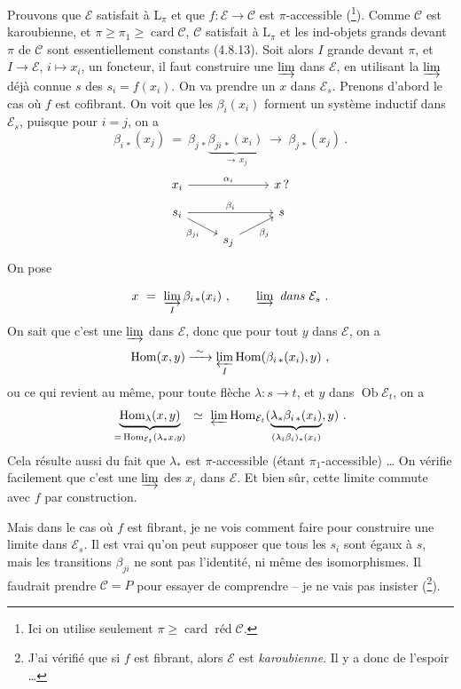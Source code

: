\documentclass[11pt]{article}
\newcommand{\printedpage}[1]{\marginpar{\footnotesize p.~#1}}
\newcommand{\msp}[1]{\marginpar{\footnotesize [#1]}}
\newcommand{\cE}{\mathcal{E}}
\newcommand{\cC}{\mathcal{C}}
\newcommand{\Ob}{\operatorname{Ob}}
\newcommand{\Hom}{\operatorname{Hom}}
\newcommand{\card}{\operatorname{card}}
\newcommand{\red}{\operatorname{\text{réd}}}
\begin{document}
Prouvons que $\cE$ satisfait à $\mathrm{L}_{\pi}$ et que $f : \cE \longrightarrow \cC$ est $\pi$-accessible (\footnote[182]{Ici on utilise seulement $\pi \geqslant \card \red \cC$.}). Comme $\cC$ est karoubienne, et $\pi \geqslant \pi_1 \geqslant \card \cC$, $\cC$ satisfait à $\mathrm{L}_{\pi}$ et les ind-objets grands devant $\pi$ de $\cC$ sont essentiellement constants (4.8.13). Soit alors $I$ grande devant $\pi$, et $I \longrightarrow \cE$, $i \longmapsto x_i$, un foncteur, il faut construire une $\varinjlim$ dans $\cE$, en utilisant la $\varinjlim$ déjà connue $s$ des $s_i = f(x_i)$. On va prendre un $x$ dans $\cE_s$. Prenons d'abord le cas où $f$ est cofibrant. On voit que les $\beta_i(x_i)$ forment un système inductif dans $\cE_s$, puisque pour $i = j$, on a
\[
\beta_{i\,*}(x_j) \ = \ \beta_{j\,*} \underbrace{\beta_{ji\,*}(x_i)}_{\longrightarrow \, x_j} \ \longrightarrow \ \beta_{j\,*}(x_j) \ . %
\]
\[
\begin{tikzcd}[row sep=small]
x_i \arrow[rr, "\alpha_i"] & & x \, ? \\
s_i \arrow[rr, "\beta_i"] \arrow[dr, "\beta_{ji}"'] & & s \\
& s_j \arrow[ur, "\beta_j"'] &
\end{tikzcd}
\]
On pose

\printedpage{168}
\msp{page 438}
\[
x \ = \ \varinjlim_{I} \beta_{i\,*}(x_i) \ , \qquad \varinjlim \ \textit{dans } \cE_s \ .
\]
On sait que c'est une $\varinjlim$ dans $\cE$, donc que pour tout $y$ dans $\cE$, on a
\[
\Hom(x, y) \xrightarrow{\ \sim\ } \varprojlim_{I} \Hom(\beta_{i\,*}(x_i), y) \ ,
\]
ou ce qui revient au même, pour toute flèche $\lambda : s \longrightarrow t$, et $y$ dans $\Ob \cE_t$, on a
\[
\underbrace{\Hom_{\lambda}(x, y)}_{= \, \Hom_{\cE_t}(\lambda_* x, y)} \ \simeq \ \varprojlim \Hom_{\cE_t}(\underbrace{\lambda_* \beta_{i\,*}(x_i)}_{(\lambda_i \beta_i)_*(x_i)}, y) \ .
\]
Cela résulte aussi du fait que $\lambda_*$ est $\pi$-accessible (étant $\pi_1$-accessible) \dots{} On vérifie facilement que c'est une $\varinjlim$ des $x_i$ dans $\cE$. Et bien sûr, cette limite commute avec $f$ par construction.

Mais dans le cas où $f$ est fibrant, je ne vois comment faire pour construire une limite dans $\cE_s$. Il est vrai qu'on peut supposer que tous les $s_i$ sont égaux à $s$, mais les transitions $\beta_{ji}$ ne sont pas l'identité, ni même des isomorphismes. Il faudrait prendre $\cC = P$ pour essayer de comprendre -- je ne vais pas insister (\footnote[183]{J'ai vérifié que si $f$ est fibrant, alors $\cE$ est \textit{karoubienne}. Il y a donc de l'espoir \dots}).
\end{document}
